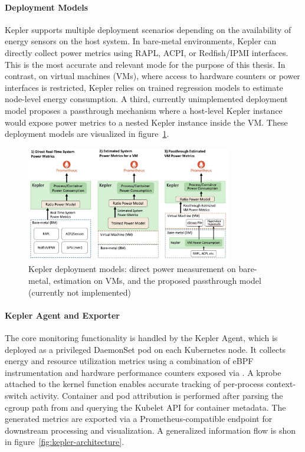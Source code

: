\paragraph{Deployment Models}
Kepler supports multiple deployment scenarios depending on the availability of energy sensors on the host system. In bare-metal environments, Kepler can directly collect power metrics using RAPL, ACPI, or Redfish/IPMI interfaces. This is the most accurate and relevant mode for the purpose of this thesis. In contrast, on virtual machines (VMs), where access to hardware counters or power interfaces is restricted, Kepler relies on trained regression models to estimate node-level energy consumption. A third, currently unimplemented deployment model proposes a passthrough mechanism where a host-level Kepler instance would expose power metrics to a nested Kepler instance inside the VM. These deployment models are visualized in figure~\ref{fig:kepler-deployment-modes}.

\begin{figure}[ht]
  \centering
  \includegraphics[width=0.8\textwidth]{Figures/kepler_deployment_modes.jpg}
  \caption{Kepler deployment models: direct power measurement on bare-metal, estimation on VMs, and the proposed passthrough model (currently not implemented)\parencite{kepler_docs}}
  \label{fig:kepler-deployment-modes}
\end{figure}

\paragraph{Kepler Agent and Exporter}
The core monitoring functionality is handled by the Kepler Agent, which is deployed as a privileged DaemonSet pod on each Kubernetes node. It collects energy and resource utilization metrics using a combination of eBPF instrumentation and hardware performance counters exposed via . A kprobe attached to the  kernel function enables accurate tracking of per-process context-switch activity. Container and pod attribution is performed after parsing the cgroup path from  and querying the Kubelet API for container metadata. The generated metrics are exported via a Prometheus-compatible endpoint for downstream processing and visualization. A generalized information flow is shon in figure~\ref{fig:kepler-architecture}.

